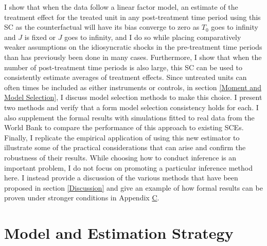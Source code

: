 \documentclass{article}
\begin{document}
 I show that when the data follow a linear factor model, an estimate of the treatment effect for the treated unit in any post-treatment time period using this SC as the counterfactual will have its bias converge to zero as $T_0$ goes to infinity and $J$ is fixed or $J$ goes to infinity, and I do so while placing comparatively weaker assumptions on the idiosyncratic shocks in the pre-treatment time periods than has previously been done in many cases. Furthermore, I show that when the number of post-treatment time periods is also large, this SC can be used to consistently estimate averages of treatment effects. Since untreated units can often times be included as either instruments or controls, in section \ref{Moment and Model Selection}, I discuss model selection methods to make this choice. I present two methods and verify that a form model selection consistency holds for each. I also supplement the formal results with simulations fitted to real data from the World Bank to compare the performance of this approach to existing SCEs. Finally, I replicate the empirical application of \cite{Abadie2015} using this new estimator to illustrate some of the practical considerations that can arise and confirm the robustness of their results. While choosing how to conduct inference is an important problem, I do not focus on promoting a particular inference method here. I instead provide a discussion of the various methods that have been proposed in section \ref{Discussion} and give an example of how formal results can be proven under stronger conditions in Appendix \hyperref[ApC]{C}.



\section{Model and Estimation Strategy} \label{Model}
\end{document}
